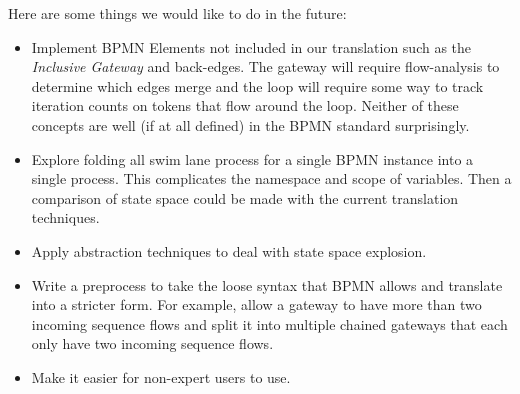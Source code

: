 \documentclass[11pt,twocolumn]{article}
\begin{document}
Here are some things we would like to do in the future:
\begin{itemize}
  \item Implement BPMN Elements not included in our translation such as the \emph{Inclusive Gateway} and back-edges. The gateway will require flow-analysis to determine which edges merge and the loop will require some way to track iteration counts on tokens that flow around the loop. Neither of these concepts are well (if at all defined) in the BPMN standard surprisingly.
  \item Explore folding all swim lane process for a single BPMN instance into a single process. This complicates the namespace and scope of variables. Then a comparison of state space could be made with the current translation techniques.
  \item Apply abstraction techniques to deal with state space explosion.
  \item Write a preprocess to take the loose syntax that BPMN allows and translate into a stricter form. For example, allow a gateway to have more than two incoming sequence flows and split it into multiple chained gateways that each only have two incoming sequence flows.
  \item Make it easier for non-expert users to use. 
\end{itemize}
\end{document}
